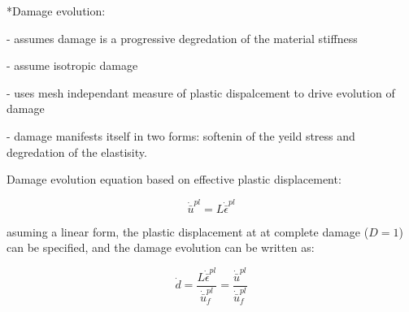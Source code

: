 {*}Damage evolution:

- assumes damage is a progressive degredation of the material stiffness

- assume isotropic damage

- uses mesh independant measure of plastic dispalcement to drive evolution
of damage

- damage manifests itself in two forms: softenin of the yeild stress
and degredation of the elastisity.

Damage evolution equation based on effective plastic displacement:

\begin{equation}
\dot{\bar{u}}^{pl}=L\dot{\bar{\epsilon}}^{pl}\label{eqn:druc9}
\end{equation}


asuming a linear form, the plastic displacement at at complete damage
($D=1$) can be specified, and the damage evolution can be written
as:

\begin{equation}
\dot{d}=\frac{L\dot{\bar{\epsilon}}^{pl}}{\dot{\bar{u}}_{f}^{pl}}=\frac{\dot{\bar{u}}^{pl}}{\dot{\bar{u}}_{f}^{pl}}\label{eqn:druc9-1}
\end{equation}

